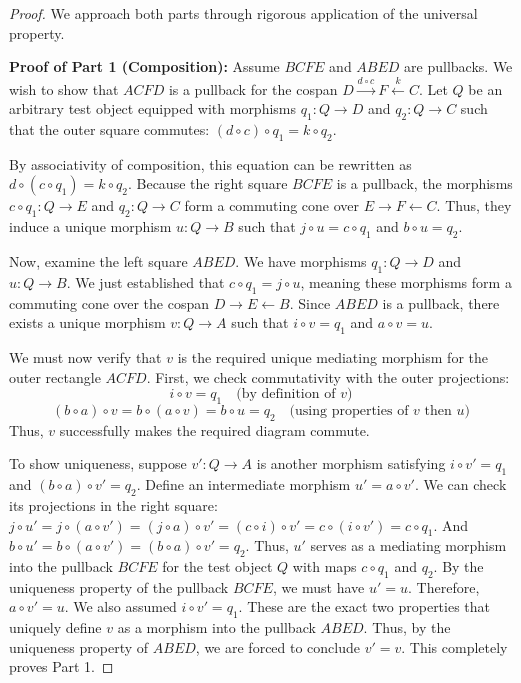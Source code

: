 \begin{proof}
We approach both parts through rigorous application of the universal property.

\textbf{Proof of Part 1 (Composition):} 
Assume $BCFE$ and $ABED$ are pullbacks. We wish to show that $ACFD$ is a pullback for the cospan $D \xrightarrow{d \circ c} F \xleftarrow{k} C$.
Let $Q$ be an arbitrary test object equipped with morphisms $q_1: Q \to D$ and $q_2: Q \to C$ such that the outer square commutes: $(d \circ c) \circ q_1 = k \circ q_2$.

By associativity of composition, this equation can be rewritten as $d \circ (c \circ q_1) = k \circ q_2$. 
Because the right square $BCFE$ is a pullback, the morphisms $c \circ q_1: Q \to E$ and $q_2: Q \to C$ form a commuting cone over $E \to F \leftarrow C$. Thus, they induce a unique morphism $u: Q \to B$ such that $j \circ u = c \circ q_1$ and $b \circ u = q_2$.

Now, examine the left square $ABED$. We have morphisms $q_1: Q \to D$ and $u: Q \to B$. We just established that $c \circ q_1 = j \circ u$, meaning these morphisms form a commuting cone over the cospan $D \to E \leftarrow B$. Since $ABED$ is a pullback, there exists a unique morphism $v: Q \to A$ such that $i \circ v = q_1$ and $a \circ v = u$.

We must now verify that $v$ is the required unique mediating morphism for the outer rectangle $ACFD$. First, we check commutativity with the outer projections:
\[
i \circ v = q_1 \quad \text{(by definition of $v$)}
\]
\[
(b \circ a) \circ v = b \circ (a \circ v) = b \circ u = q_2 \quad \text{(using properties of $v$ then $u$)}
\]
Thus, $v$ successfully makes the required diagram commute. 

To show uniqueness, suppose $v': Q \to A$ is another morphism satisfying $i \circ v' = q_1$ and $(b \circ a) \circ v' = q_2$.
Define an intermediate morphism $u' = a \circ v'$. We can check its projections in the right square:
$j \circ u' = j \circ (a \circ v') = (j \circ a) \circ v' = (c \circ i) \circ v' = c \circ (i \circ v') = c \circ q_1$.
And $b \circ u' = b \circ (a \circ v') = (b \circ a) \circ v' = q_2$.
Thus, $u'$ serves as a mediating morphism into the pullback $BCFE$ for the test object $Q$ with maps $c \circ q_1$ and $q_2$. By the uniqueness property of the pullback $BCFE$, we must have $u' = u$.
Therefore, $a \circ v' = u$. We also assumed $i \circ v' = q_1$. These are the exact two properties that uniquely define $v$ as a morphism into the pullback $ABED$. Thus, by the uniqueness property of $ABED$, we are forced to conclude $v' = v$. This completely proves Part 1.


\end{proof}

